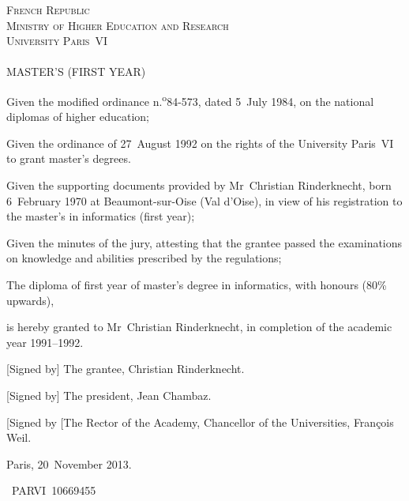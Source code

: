 \documentclass[a4paper,11pt,twoside]{article}
\begin{document}
\begin{center}
\textsc{French Republic}\\
\textsc{Ministry of Higher Education and Research}\\
\textsc{University Paris~VI}\\
\ \\
\textsc{\Large MASTER'S (FIRST YEAR)}
\end{center}
Given the modified ordinance n.\kern-0.5bp\textsuperscript{o}84-573,
dated 5~July 1984, on the national diplomas of higher education;

\medskip

Given the ordinance of 27~August 1992 on the rights of the University
Paris~VI to grant master's degrees.

\medskip

Given the supporting documents provided by Mr~Christian Rinderknecht,
born 6~February 1970 at Beaumont-sur-Oise (Val d'Oise), in view of his
registration to the master's in informatics (first year);

\medskip

Given the minutes of the jury, attesting that the grantee passed the
examinations on knowledge and abilities prescribed by the regulations;

\medskip

The diploma of first year of master's degree in informatics, with
honours (80\% upwards),

\medskip

is hereby granted to Mr~Christian Rinderknecht, in completion of the
academic year 1991--1992.

\bigskip

[Signed by] The grantee, Christian Rinderknecht.

[Signed by] The president, Jean Chambaz.

[Signed by [The Rector of the Academy, Chancellor of the Universities,
    François Weil.

\bigskip

Paris, 20~November 2013.

\bigskip

\textnumero~PARVI~10669455 

\thispagestyle{empty}
\end{document}
